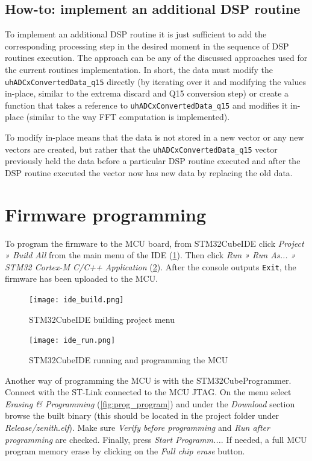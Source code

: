 \subsection{How-to: implement an additional DSP routine}

To implement an additional DSP routine it is just sufficient to add the corresponding processing step in the desired moment in the sequence of DSP routines execution. The approach can be any of the discussed approaches used for the current routines implementation. In short, the data must modify the \texttt{uhADCxConvertedData\_q15} directly (by iterating over it and modifying the values in-place, similar to the extrema discard and Q15 conversion step) or create a function that takes a reference to \texttt{uhADCxConvertedData\_q15} and modifies it in-place (similar to the way FFT computation is implemented).

To modify in-place means that the data is not stored in a new vector or any new vectors are created, but rather that the \texttt{uhADCxConvertedData\_q15} vector previously held the data before a particular DSP routine executed and after the DSP routine executed the vector now has new data by replacing the old data.

\section{Firmware programming}

To program the firmware to the MCU board, from STM32CubeIDE click \textit{Project » Build All} from the main menu of the IDE (\cref{fig:ide_build}). Then click \textit{Run » Run As... » STM32 Cortex-M C/C++ Application} (\cref{fig:ide_run}). After the console outputs \texttt{Exit}, the firmware has been uploaded to the MCU.

\begin{figure}[ht]
	\centering
	\texttt{[image: ide\_build.png]}
	\caption{STM32CubeIDE building project menu \label{fig:ide_build}}
\end{figure}

\begin{figure}[ht]
	\centering
	\texttt{[image: ide\_run.png]}
	\caption{STM32CubeIDE running and programming the MCU \label{fig:ide_run}}
\end{figure}

Another way of programming the MCU is with the STM32CubeProgrammer. Connect with the ST-Link connected to the MCU JTAG. On the menu select \textit{Erasing \& Programming} (\cref{fig:prog_program}) and under the \textit{Download} section browse the built binary (this should be located in the project folder under \textit{Release/zenith.elf}). Make sure \textit{Verify before programming} and \textit{Run after programming} are checked. Finally, press \textit{Start Programm...}. If needed, a full MCU program memory erase by clicking on the \textit{Full chip erase} button.

